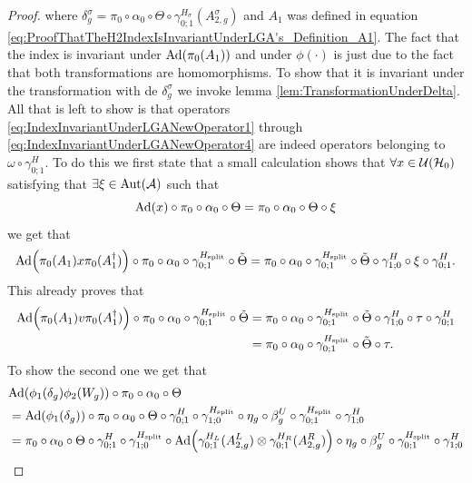\documentclass[12pt,a4paper,twoside]{article}
\numberwithin{equation}{section}
\begin{document}
\begin{proof}
	where $\delta^\sigma_g=\pi_0\circ\alpha_0\circ\Theta\circ\gamma^{H_\sigma}_{0;1}(A^\sigma_{2,g})$ and $A_1$ was defined in equation \eqref{eq:ProofThatTheH2IndexIsInvariantUnderLGA's_Definition_A1}. The fact that the index is invariant under $\Ad{\pi_0(A_1)}$ and under $\phi(\cdot)$ is just due to the fact that both transformations are homomorphisms. To show that it is invariant under the transformation with de $\delta^\sigma_g$ we invoke lemma \ref{lem:TransformationUnderDelta}. All that is left to show is that operators \eqref{eq:IndexInvariantUnderLGANewOperator1} through \eqref{eq:IndexInvariantUnderLGANewOperator4} are indeed operators belonging to $\omega\circ\gamma^{H}_{0;1}$. To do this we first state that a small calculation shows that $\forall x\in\mathcal U(\mathcal H_0)$ satisfying that $\exists\xi\in\Aut{\AA}$ such that
	\begin{equation}
		\Ad{x}\circ\pi_0\circ\alpha_0\circ\Theta=\pi_0\circ\alpha_0\circ\Theta\circ\xi
	\end{equation}
	we get that
	\begin{equation}\label{eq:IndexInvariantUnderLGA_A1_Transformation}
		\Ad{\pi_0(A_1)x\pi_0(A_1^\dagger)}\circ\pi_0\circ\alpha_0\circ\gamma^{H_\text{split}}_{0;1}\circ\tilde{\Theta}=\pi_0\circ\alpha_0\circ\gamma^{H_\text{split}}_{0;1}\circ\tilde{\Theta}\circ\gamma^H_{1;0}\circ\xi\circ\gamma^H_{0;1}.
	\end{equation}
	This already proves that
	\begin{align}
		\Ad{\pi_0(A_1)v\pi_0(A_1^\dagger)}\circ\pi_0\circ\alpha_0\circ\gamma^{H_\text{split}}_{0;1}\circ\tilde{\Theta}&=\pi_0\circ\alpha_0\circ\gamma^{H_\text{split}}_{0;1}\circ\tilde{\Theta}\circ\gamma^H_{1;0}\circ\tau\circ\gamma^H_{0;1}\\
		&=\pi_0\circ\alpha_0\circ\gamma^{H_\text{split}}_{0;1}\circ\tilde{\Theta}\circ\tau.
	\end{align}
	To show the second one we get that
	\begin{align}
		&\Ad{\phi_1(\delta_g)\phi_2(W_g)}\circ\pi_0\circ\alpha_0\circ\Theta\\
		&=\Ad{\phi_1(\delta_g)}\circ\pi_0\circ\alpha_0\circ\Theta\circ\gamma^{H}_{0;1}\circ\gamma^{H_\text{split}}_{1;0}\circ\eta_g\circ\beta_g^U\circ\gamma^{H_\text{split}}_{0;1}\circ\gamma^H_{1;0}\\
		&=\pi_0\circ\alpha_0\circ\Theta\circ\gamma^{H}_{0;1}\circ\gamma^{H_\text{split}}_{1;0}\circ\Ad{\gamma^{H_L}_{0;1}(A_{2,g}^L)\otimes\gamma^{H_R}_{0;1}(A_{2,g}^R)}\circ\eta_g\circ\beta_g^U\circ\gamma^{H_\text{split}}_{0;1}\circ\gamma^H_{1;0}\\

\end{align}
\end{proof}
\end{document}
